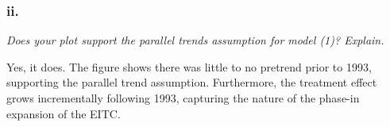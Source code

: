 \documentclass[
]{article}
\begin{document}
\hypertarget{ii.-1}{%
\subsubsection{ii.}\label{ii.-1}}

\emph{Does your plot support the parallel trends assumption for model
(1)? Explain.}

Yes, it does. The figure shows there was little to no pretrend prior to
1993, supporting the parallel trend assumption. Furthermore, the
treatment effect grows incrementally following 1993, capturing the
nature of the phase-in expansion of the EITC.
\end{document}
